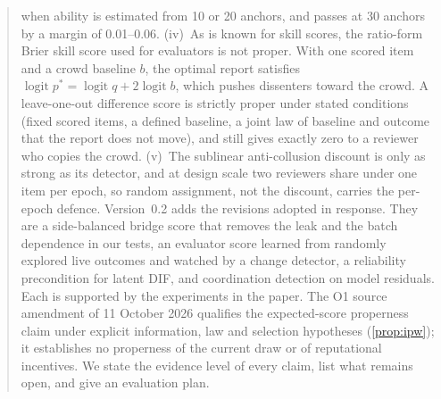 \documentclass[11pt,a4paper]{article}
\begin{document}
\begin{abstract}
when ability is estimated from 10 or 20 anchors, and passes at 30 anchors by a margin of 0.01--0.06.
(iv)~As is known for skill scores, the ratio-form Brier skill score used for evaluators is not
proper. With one scored item and a crowd baseline $b$, the optimal report satisfies
$\operatorname{logit}p^{*}=\operatorname{logit}q+2\operatorname{logit}b$, which pushes
dissenters toward the crowd.
A leave-one-out difference score is strictly proper under stated conditions (fixed scored items,
a defined baseline, a joint law of baseline and outcome that the report does not move), and still
gives exactly zero to a reviewer who copies the crowd.
(v)~The sublinear anti-collusion discount is only as strong as its detector, and at design
scale two reviewers share under one item per epoch, so random assignment, not the discount,
carries the per-epoch defence.
Version~0.2 adds the revisions adopted in response. They are a side-balanced bridge score that
removes the leak and the batch dependence in our tests, an evaluator score learned from
randomly explored live outcomes and watched by a change detector, a reliability precondition
for latent DIF, and coordination detection on model residuals. Each is supported by the
experiments in the paper.
The O1 source amendment of 11 October 2026 qualifies the expected-score properness claim
under explicit information, law and selection hypotheses (\cref{prop:ipw}); it establishes
no properness of the current draw or of reputational incentives.
We state the evidence level of every claim, list what remains open, and give an evaluation plan.
\end{abstract}

\tableofcontents
\clearpage

















\appendix



\end{document}
